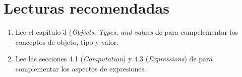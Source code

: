 \section{Lecturas recomendadas}

\begin{enumerate}

\item Lee el capítulo 3 (\emph{Objects, Types, and values} 
      de \pppbook{}
      para compelementar los conceptos de objeto, tipo y valor.

\item Lee las secciones 4.1 (\emph{Computation}) y 4.3 (\emph{Expressions}) 
      de \pppbook{}
      para complementar los aspectos de expresiones.

\end{enumerate}
